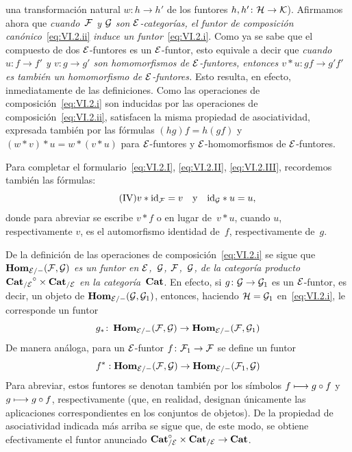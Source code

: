 una transformación natural $w\colon h\to h'$ de los funtores
$h,h'\colon \cal{H}\to\cal{K}$). Afirmamos ahora que
\emph{cuando~$\cal{F}$ y $\cal{G}$ son $\cal{E}$-categorías, el funtor de
composición canónico}~\eqref{eq:VI.2.ii}
\emph{induce un funtor}~\eqref{eq:VI.2.i}. Como ya se sabe que el compuesto de
dos $\cal{E}$-funtores es un $\cal{E}$-funtor, esto equivale a decir que
\emph{cuando $u\colon f\to f'$ y $v\colon g\to g'$ son homomorfismos de
$\cal{E}$-funtores, entonces $v*u\colon gf\to g'f'$ es también un homomorfismo
de $\cal{E}$-funtores.} Esto resulta, en efecto, inmediatamente de las
definiciones. Como las operaciones de composición~\eqref{eq:VI.2.i} son
inducidas por las operaciones de composición~\eqref{eq:VI.2.ii}, satisfacen la
misma propiedad de
asociatividad, expresada también por las fórmulas $(hg)f=h(gf)$ y
$(w*v)*u=w*(v*u)$ para $\cal{E}$-funtores y $\cal{E}$-homomorfismos de
$\cal{E}$-funtores.

Para completar el formulario~\eqref{eq:VI.2.I}, \eqref{eq:VI.2.II},
\eqref{eq:VI.2.III}, recordemos también las fórmulas:
\begin{equation*}
\label{eq:VI.2.IV}
\tag{IV} {v*\id_{\cal{F}}=v\quad\text{y}\quad\id_{\cal{G}}*u=u}\quoi,
\end{equation*}
donde
para abreviar se escribe $v*f$ o
 en lugar de~$v*u$, cuando $u$,
respectivamente $v$, es el automorfismo identidad de~$f$, respectivamente
de~$g$.

De la definición de las operaciones de composición~\eqref{eq:VI.2.i} se sigue
que
$\SheafHom_{\cal{E}/-}(\cal{F},\cal{G})$ \emph{es un funtor en
{$\cal{E}$,~$\cal{G}$,}
{$\cal{F}$,~$\cal{G}$,}
de la categoría producto ${\Cat_{/\cal{E}}}^\circ\times\Cat_{/\cal{E}}$ en la
categoría~$\Cat$}. En efecto, si $g\colon \cal{G}\to\cal{G}_1$ es un
$\cal{E}$-funtor, es decir, un objeto de
$\SheafHom_{\cal{E}/-}(\cal{G},\cal{G}_1)$, entonces, haciendo
$\cal{H}=\cal{G}_1$ en~\eqref{eq:VI.2.i}, le corresponde un funtor
$$
g_*\colon\SheafHom_{\cal{E}/-}(\cal{F},\cal{G})\to
\SheafHom_{\cal{E}/-}(\cal{F},\cal{G}_1)
$$
De manera análoga, para un $\cal{E}$-funtor
$f\colon \cal{F}_1\to \cal{F}$ se define un funtor
$$
f^*:\SheafHom_{\cal{E}/-}(\cal{F},\cal{G})\to
\SheafHom_{\cal{E}/-}(\cal{F}_1,\cal{G})
$$
Para abreviar, estos funtores se denotan también por los símbolos
$f\mto g\circ f$ y $g\mto g\circ f$, respectivamente (que, en realidad,
designan únicamente las aplicaciones correspondientes en los conjuntos de
objetos). De la propiedad de asociatividad indicada más arriba se sigue que,
de este modo, se obtiene efectivamente el funtor anunciado
$\Cat_{/\cal{E}}^\circ\times\Cat_{/\cal{E}}\to\Cat$.

